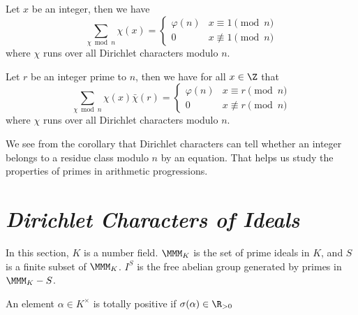 \begin{proposition}
    Let $x$ be an integer, then we have $$ \sum_{\chi\bmod n}{\chi(x)}=\begin{cases} \varphi(n) & x\equiv1\pmod n \\ 0 & x\not\equiv1\pmod n \end{cases} $$ where $\chi$ runs over all Dirichlet characters modulo $n$.
\end{proposition}

\begin{corollary}
    Let $r$ be an integer prime to $n$, then we have for all $x\in\Z$ that $$ \sum_{\chi\bmod n}{\chi(x)\bar\chi(r)}=\begin{cases} \varphi(n) & x\equiv r\pmod n \\ 0 & x\not\equiv r\pmod n \end{cases} $$ where $\chi$ runs over all Dirichlet characters modulo $n$.
\end{corollary}

\begin{remark}
    We see from the corollary that Dirichlet characters can tell whether an integer belongs to a residue class modulo $n$ by an equation. That helps us study the properties of primes in arithmetic progressions.
\end{remark}




\section{\emph{Dirichlet Characters of Ideals}}

\begin{notation}
    In this section, $K$ is a number field. $\MMM_K$ is the set of prime ideals in $K$, and $S$ is a finite subset of $\MMM_K$. $I^S$ is the free abelian group generated by primes in $\MMM_K-S$.
\end{notation}

\begin{definition}
    An element $\alpha\in K^\times$ is totally positive if $\sigma(\alpha)\in\R_{>0}$
\end{definition}
